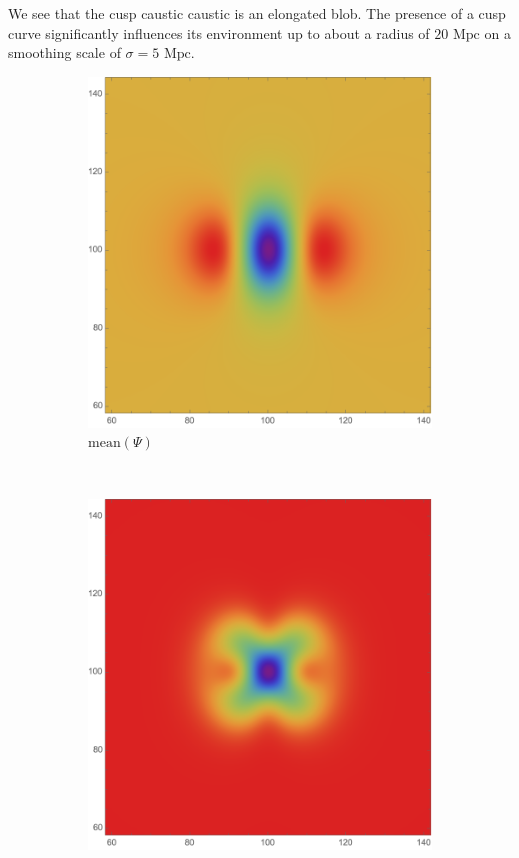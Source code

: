 \documentclass[a4paper, 11pt]{article}
\begin{document}
We see that the cusp caustic caustic is an elongated blob. The presence of a cusp curve significantly influences its environment up to about a radius of $20\text{ Mpc}$ on a smoothing scale of $\sigma = 5 \text{ Mpc}$.


\begin{figure}
\centering
\begin{subfigure}[b]{0.32\textwidth}
\includegraphics[width=\textwidth]{Cusp_mean}
\caption{$\text{mean}(\Psi)$}
\end{subfigure}~
\begin{subfigure}[b]{0.32\textwidth}
\includegraphics[width=\textwidth]{Cusp_variance}

\end{subfigure}
\end{figure}
\end{document}
